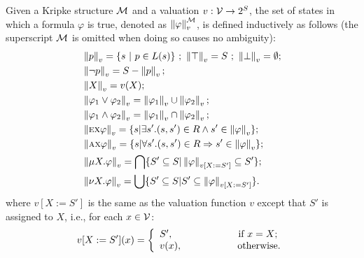 \documentclass[runningheads]{llncs}
\begin{document}
Given a Kripke structure ${\cal M}$ and a valuation $v: {\cal V} \rightarrow 2^S$, the set of states
in which a formula $\varphi$ is true, denoted as $\left\| \varphi\right\|_v^{{\cal M}}$, is defined inductively as follows (the superscript ${\cal M}$ is omitted when doing so causes no ambiguity):
\begin{align*}
	& \left \| p\right \|_v = \{s\ |\ p \in L(s)\} \ ;\ \left\|\top\right\|_v = S \ ;\ \left\|\bot\right\|_v = \emptyset; \\
	& \left\|\neg p\right\|_v = S- \left\| p\right\|_v;\\
	& \left\| X\right\|_v = v(X);\\
	& \left\|\varphi_1 \vee \varphi_2\right\|_v = \left\|\varphi_1\right\|_v \cup \left\|\varphi_2\right\|_v;\\
	& \left\|\varphi_1 \wedge \varphi_2\right\|_v = \left\|\varphi_1\right\|_v \cap \left\|\varphi_2\right\|_v;\\
	& \left\|\EXIST \NEXT \varphi\right\|_v = \{s| \exists s'. (s, s') \in R \wedge s' \in \left\|\varphi\right\|_v\};\\
	& \left\|\ALL \NEXT \varphi\right\|_v = \{s| \forall s'. (s, s') \in R \Rto s' \in \left\|\varphi\right\|_v\};\\
	& \left\| \mu X. \varphi\right\|_v = \bigcap\{S' \subseteq S | \left\|\varphi\right\|_{v[X:= S']} \subseteq S'\};\\
	& \left\| \nu X. \varphi\right\|_v = \bigcup\{S' \subseteq S | S' \subseteq \left\|\varphi\right\|_{v[X:= S']}\}.
\end{align*}
where $v[X:= S']$ is the same as the valuation function $v$ except that $S'$ is assigned to $X$, i.e., for each $x\in {\cal V}$:
\[v[X:= S'](x) =
\left\{
\begin{array}{ll}
	S', \ \ \qquad \qquad \qquad \hbox{if $x = X$;} \\
	v(x), \ \ \ \qquad \qquad \ \ \hbox{otherwise.}
\end{array}
\right.
\]
\end{document}
